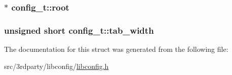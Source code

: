 \label{structconfig__t_ac0ac2e11cba896d1a365aa680125e641}
\hypertarget{structconfig__t_a32f9518ccc7f8a65b5f794fc9d38a565}{
\subsubsection[{root}]{$\ast$ {\bf config\_\-t::root}}}
\label{structconfig__t_a32f9518ccc7f8a65b5f794fc9d38a565}
\hypertarget{structconfig__t_aaa1a237aeadf1111eaac6946b252c227}{
\subsubsection[{tab\_\-width}]{\setlength{\rightskip}{0pt plus 5cm}unsigned short {\bf config\_\-t::tab\_\-width}}}
\label{structconfig__t_aaa1a237aeadf1111eaac6946b252c227}


The documentation for this struct was generated from the following file:\begin{DoxyCompactItemize}
\item 
src/3rdparty/libconfig/\hyperlink{libconfig_8h}{libconfig.h}\end{DoxyCompactItemize}
